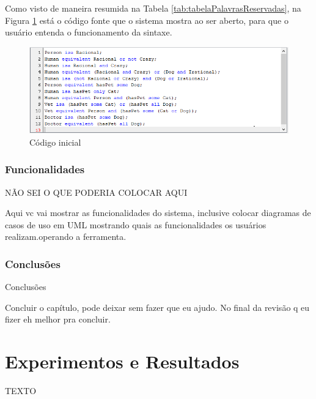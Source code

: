 \documentclass{bcc}
\begin{document}
Como visto de maneira resumida na Tabela \ref{tab:tabelaPalavrasReservadas}, na Figura \ref{fig:codigoFonteInicial} está o código fonte que o sistema mostra ao ser aberto, para que o usuário entenda o funcionamento da sintaxe.

\begin{figure}[H]
\centering
\includegraphics[width=.8\textwidth]{Figuras/codigo_codigofonte_inicial.png}
\caption{Código inicial}
\label{fig:codigoFonteInicial}
\end{figure}

\subsection{Funcionalidades}
NÃO SEI O QUE PODERIA COLOCAR AQUI

Aqui vc vai mostrar as funcionalidades do sistema, inclusive colocar diagramas de casos de uso em UML mostrando quais as funcionalidades os usuários realizam.operando a ferramenta.

\subsection{Conclusões}
Conclusões

Concluir o capítulo, pode deixar sem fazer que eu ajudo. No final da revisão q eu fizer eh melhor pra concluir.


\chapter{Experimentos e Resultados}
\label{chap:conclusao}

TEXTO



\end{document}
